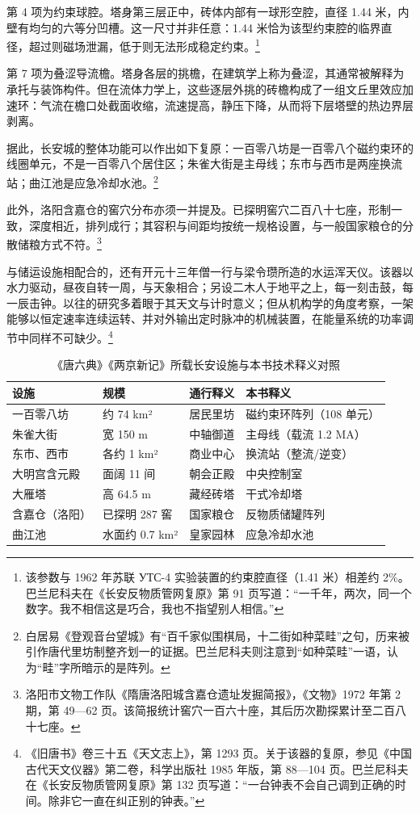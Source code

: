 第 4 项为约束球腔。塔身第三层正中，砖体内部有一球形空腔，直径 1.44 米，内壁有均匀的六等分凹槽。这一尺寸并非任意：1.44 米恰为该型约束腔的临界直径，超过则磁场泄漏，低于则无法形成稳定约束。\footnote{该参数与 1962 年苏联 УТС-4 实验装置的约束腔直径（1.41 米）相差约 2\%。巴兰尼科夫在《长安反物质管网复原》第 91 页写道：“一千年，两次，同一个数字。我不相信这是巧合，我也不指望别人相信。”}

第 7 项为叠涩导流檐。塔身各层的挑檐，在建筑学上称为叠涩，其通常被解释为承托与装饰构件。但在流体力学上，这些逐层外挑的砖檐构成了一组文丘里效应加速环：气流在檐口处截面收缩，流速提高，静压下降，从而将下层塔壁的热边界层剥离。

据此，长安城的整体功能可以作出如下复原：一百零八坊是一百零八个磁约束环的线圈单元，不是一百零八个居住区；朱雀大街是主母线；东市与西市是两座换流站；曲江池是应急冷却水池。\footnote{白居易《登观音台望城》有“百千家似围棋局，十二街如种菜畦”之句，历来被引作唐代里坊制整齐划一的证据。巴兰尼科夫则注意到“如种菜畦”一语，认为“畦”字所暗示的是阵列。}

此外，洛阳含嘉仓的窖穴分布亦须一并提及。已探明窖穴二百八十七座，形制一致，深度相近，排列成行；其容积与间距均按统一规格设置，与一般国家粮仓的分散储粮方式不符。\footnote{洛阳市文物工作队《隋唐洛阳城含嘉仓遗址发掘简报》，《文物》1972 年第 2 期，第 49—62 页。该简报统计窖穴一百六十座，其后历次勘探累计至二百八十七座。}

与储运设施相配合的，还有开元十三年僧一行与梁令瓒所造的水运浑天仪。该器以水力驱动，昼夜自转一周，与天象相合；另设二木人于地平之上，每一刻击鼓，每一辰击钟。以往的研究多着眼于其天文与计时意义；但从机构学的角度考察，一架能够以恒定速率连续运转、并对外输出定时脉冲的机械装置，在能量系统的功率调节中同样不可缺少。\footnote{《旧唐书》卷三十五《天文志上》，第 1293 页。关于该器的复原，参见《中国古代天文仪器》第二卷，科学出版社 1985 年版，第 88—104 页。巴兰尼科夫在《长安反物质管网复原》第 132 页写道：“一台钟表不会自己调到正确的时间。除非它一直在纠正别的钟表。”}

\begin{table}[htbp]
\centering
\caption{《唐六典》《两京新记》所载长安设施与本书技术释义对照}
\label{tab:changan}
\footnotesize
\begin{tabular}{@{}p{28mm}p{32mm}p{30mm}p{38mm}@{}}
\toprule
\textbf{设施} & \textbf{规模} & \textbf{通行释义} & \textbf{本书释义}\\
\midrule
一百零八坊 & 约 74 km² & 居民里坊 & 磁约束环阵列（108 单元）\\
朱雀大街 & 宽 150 m & 中轴御道 & 主母线（载流 1.2 MA）\\
东市、西市 & 各约 1 km² & 商业中心 & 换流站（整流/逆变）\\
大明宫含元殿 & 面阔 11 间 & 朝会正殿 & 中央控制室\\
大雁塔 & 高 64.5 m & 藏经砖塔 & 干式冷却塔\\
含嘉仓（洛阳） & 已探明 287 窖 & 国家粮仓 & 反物质储罐阵列\\
曲江池 & 水面约 0.7 km² & 皇家园林 & 应急冷却水池\\
\bottomrule
\end{tabular}
\end{table}


